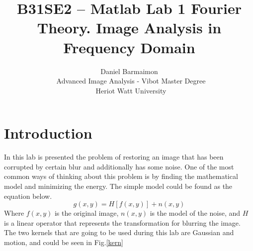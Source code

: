 \documentclass[a4paper, 10pt, conference] {article}
\begin{document}
\date{}
\title{\LARGE \bf
B31SE2 – Matlab Lab 1
Fourier Theory. Image Analysis in Frequency Domain
}

\author{ \parbox{5 in}{\centering Daniel Barmaimon \\
         \ Advanced Image Analysis - Vibot Master Degree\\
         \ Heriot Watt University\\         
}}

\maketitle


\section{Introduction}
In this lab is presented the problem of restoring an image that has been corrupted by certain blur and additionally has some noise. One of the most common ways of thinking about this problem is by finding the mathematical model and minimizing the energy. The simple model could be found as the equation below. 
\begin{equation}
g(x,y) = H[f(x,y)]+ n(x,y) 	
\end{equation} 
Where \textit{$f(x,y)$} is the original image, \textit{$n(x,y)$} is the model of the noise, and \textit{$H$} is a linear operator that represents the transformation for blurring the image.
The two kernels that are going to be used during this lab are Gaussian and motion, and could be seen in Fig.\ref{kern}
\end{document}
